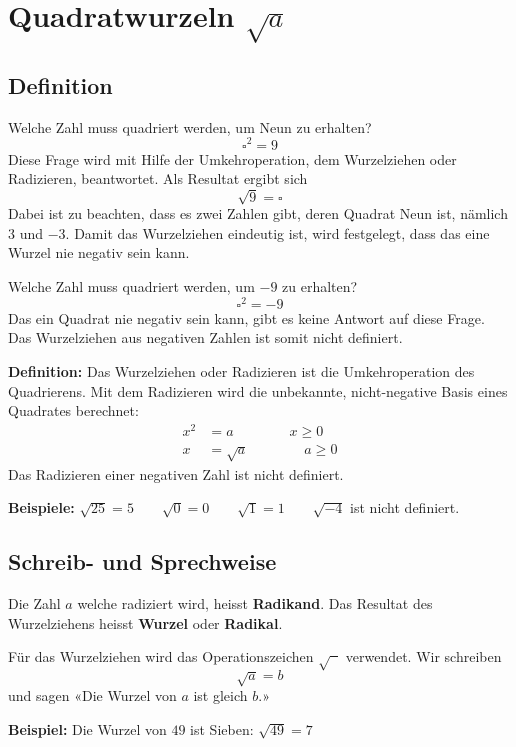 \newpage
\section{Quadratwurzeln $\sqrt{a}$}

\subsection{Definition}

Welche Zahl muss quadriert werden, um Neun zu erhalten?
\[
  \square^{2} = 9
\]
Diese Frage wird mit Hilfe der Umkehroperation, dem Wurzelziehen oder Radizieren, beantwortet. Als Resultat ergibt sich
\[
  \sqrt{9} = \square
\]
Dabei ist zu beachten, dass es zwei Zahlen gibt, deren Quadrat Neun ist, nämlich $3$ und $-3$. Damit das Wurzelziehen eindeutig ist, wird festgelegt, dass das eine Wurzel nie negativ sein kann.

Welche Zahl muss quadriert werden, um $-9$ zu erhalten?
\[
  \square^{2}= -9
\]
Das ein Quadrat nie negativ sein kann, gibt es keine Antwort auf diese Frage. Das Wurzelziehen aus negativen Zahlen ist somit nicht definiert.

\textbf{Definition:} Das Wurzelziehen oder Radizieren ist die Umkehroperation des Quadrierens. Mit dem Radizieren wird die unbekannte, nicht-negative Basis eines Quadrates berechnet:
\begin{align*}
  x^{2} &= a \qquad\qquad x\ge 0\\
      x &= \sqrt{a} \qquad\qquad a\ge 0
\end{align*}
Das Radizieren einer negativen Zahl ist nicht definiert.
\begin{example}
  \textbf{Beispiele:} $\sqrt{25} = 5 \qquad \sqrt{0} = 0 \qquad \sqrt{1} = 1 \qquad \sqrt{-4}$ ist nicht definiert.
\end{example}

\subsection{Schreib- und Sprechweise}

Die Zahl $a$ welche radiziert wird, heisst \textbf{Radikand}. Das Resultat des Wurzelziehens heisst \textbf{Wurzel} oder \textbf{Radikal}.

Für das Wurzelziehen wird das Operationszeichen $\sqrt{\phantom{x}}$ verwendet. Wir schreiben
\[
  \sqrt{a} = b
\]
und sagen «Die Wurzel von $a$ ist gleich $b$.»
\begin{example}
  \textbf{Beispiel:} Die Wurzel von $49$ ist Sieben: $\sqrt{49} = 7$
\end{example}

